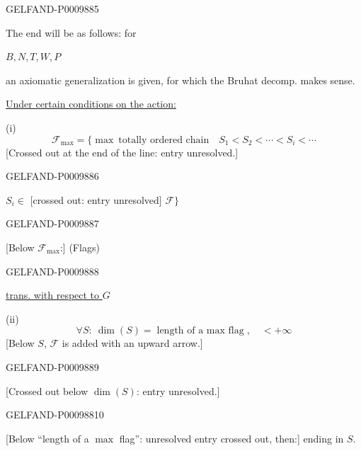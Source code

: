 \begin{GelfandAdjacentEvidence}{GELFAND-P000988}{5}


The end will be as follows: for

$B,N,T,W,P$

an axiomatic generalization is given, for which the Bruhat decomp. makes sense.

\underline{Under certain conditions on the action:}

(i)
\[
\mathcal F_{\max}=\{\max\ \text{totally ordered chain}\quad
S_1<S_2<\cdots<S_i<\cdots
\]
[Crossed out at the end of the line: entry unresolved.]
\end{GelfandAdjacentEvidence}
\begin{GelfandAdjacentEvidence}{GELFAND-P000988}{6}


$S_i\in$ [crossed out: entry unresolved] $\mathcal F\}$
\end{GelfandAdjacentEvidence}
\begin{GelfandAdjacentEvidence}{GELFAND-P000988}{7}


[Below $\mathcal F_{\max}$:] (Flags)

\end{GelfandAdjacentEvidence}
\begin{GelfandAdjacentEvidence}{GELFAND-P000988}{8}


\underline{trans. with respect to $G$}

(ii)
\[
\forall S:\ \dim(S)=\text{length of a $\max$ flag},\quad<+\infty
\]
[Below $S$, $\mathcal F$ is added with an upward arrow.]
\end{GelfandAdjacentEvidence}
\begin{GelfandAdjacentEvidence}{GELFAND-P000988}{9}


[Crossed out below $\dim(S)$: entry unresolved.]
\end{GelfandAdjacentEvidence}
\begin{GelfandAdjacentEvidence}{GELFAND-P000988}{10}


[Below “length of a $\max$ flag”: unresolved entry crossed out, then:] ending in $S$.
\end{GelfandAdjacentEvidence}
